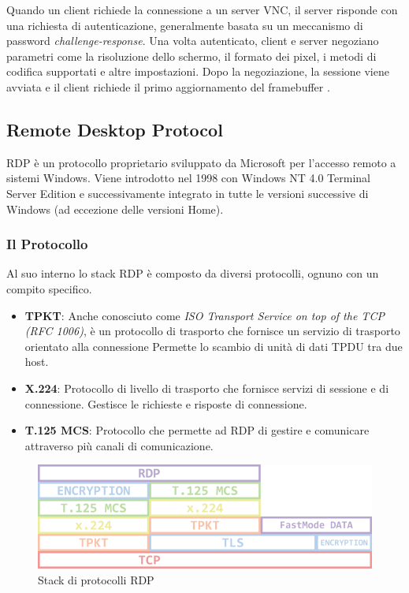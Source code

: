 \documentclass[12pt,a4paper,openright,twoside]{book}
\begin{document}
Quando un client richiede la connessione a un server \ac{VNC},
il server risponde con una richiesta di autenticazione,
generalmente basata su un meccanismo di password \textit{challenge-response}.
%
Una volta autenticato, client e server negoziano parametri come la risoluzione dello schermo,
il formato dei pixel, i metodi di codifica supportati e altre impostazioni.
%
Dopo la negoziazione, la sessione viene avviata e il client richiede il primo aggiornamento del framebuffer \cite{richardson1998vnc}.

\subsection{Remote Desktop Protocol}
\label{sec:rdp}
\ac{RDP} è un protocollo proprietario sviluppato da Microsoft per l'accesso remoto a sistemi Windows.
Viene introdotto nel 1998 con Windows NT 4.0 Terminal Server Edition e successivamente integrato in tutte le versioni successive di Windows (ad eccezione delle versioni Home).

\subsubsection{Il Protocollo}
Al suo interno lo stack \ac{RDP} è composto da diversi protocolli, ognuno con un compito specifico.
\begin{itemize}
    \item \textbf{TPKT}: Anche conosciuto come \emph{ISO Transport Service on top of the TCP (RFC 1006)}, è un protocollo di trasporto che fornisce un servizio di trasporto orientato alla connessione
     Permette lo scambio di unità di dati \ac{TPDU} tra due host.
    \item \textbf{X.224}: Protocollo di livello di trasporto che fornisce servizi di sessione e di connessione. Gestisce le richieste e risposte di connessione.
    \item \textbf{T.125 MCS}: Protocollo che permette ad \ac{RDP} di gestire e comunicare attraverso più canali di comunicazione.
\end{itemize}

\begin{figure}
    \centering
    \includegraphics[width=.5\linewidth]{figures/3-protocol_stack-768x239.png}
    \caption[xarch]{Stack di protocolli \ac{RDP} \footnotemark}
\end{figure}
\end{document}
